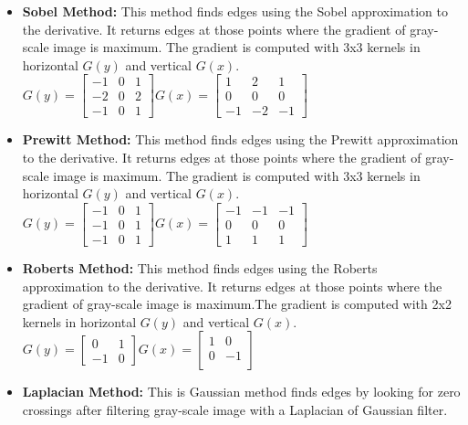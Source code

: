 \begin{itemize}
	\item{\textbf{Sobel Method:} This method finds edges using the Sobel approximation to the derivative. It returns edges at those points where the gradient of gray-scale image is maximum. The gradient is computed with 3x3 kernels in horizontal $G(y)$ and vertical $G(x)$.\\
		$G(y) = \begin{bmatrix}
			-1 & 0 & 1\\
			-2 & 0 & 2\\
			-1 & 0 & 1
		\end{bmatrix}
		G(x) =\begin{bmatrix}
			1 & 2 & 1\\
			0 & 0 & 0\\
			-1 & -2 & -1
		\end{bmatrix}$
		 }
	\item{\textbf{Prewitt Method:} This method finds edges using the Prewitt approximation to the derivative. It returns edges at those points where the gradient of gray-scale image is maximum. The gradient is computed with 3x3 kernels in horizontal $G(y)$ and vertical $G(x)$.\\
			$G(y) = \begin{bmatrix}
				-1 & 0 & 1\\
				-1 & 0 & 1\\
				-1 & 0 & 1
			\end{bmatrix}
			G(x) =\begin{bmatrix}
				-1 & -1 & -1\\
				0 & 0 & 0\\
				1 & 1 & 1
			\end{bmatrix}$
		}
	\item{\textbf{Roberts Method:} This method finds edges using the Roberts approximation to the derivative. It returns edges at those points where the gradient of gray-scale image is maximum.The gradient is computed with 2x2 kernels in horizontal $G(y)$ and vertical $G(x)$.\\
			$
			G(y) =\begin{bmatrix}
			0 & 1\\
			-1 & 0
			\end{bmatrix}
			G(x) = \begin{bmatrix}
			1 & 0 \\
			0 & -1\\
			\end{bmatrix}$
		}
	\item{\textbf{Laplacian Method:} This is Gaussian method finds edges by looking for zero crossings after filtering gray-scale image with a Laplacian of Gaussian filter.}

\end{itemize}
